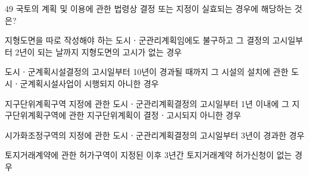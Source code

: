 \begin{question}{49}
국토의 계획 및 이용에 관한 법령상 결정 또는 지정이 실효되는 경우에 해당하는 것은?
\begin{choices}
  \item 지형도면을 따로 작성해야 하는 도시ㆍ군관리계획임에도 불구하고 그 결정의 고시일부터 2년이 되는 날까지 지형도면의 고시가 없는 경우
  \item 도시ㆍ군계획시설결정의 고시일부터 10년이 경과될 때까지 그 시설의 설치에 관한 도시ㆍ군계획시설사업이 시행되지 아니한 경우
  \item 지구단위계획구역 지정에 관한 도시ㆍ군관리계획결정의 고시일부터 1년 이내에 그 지구단위계획구역에 관한 지구단위계획이 결정ㆍ고시되지 아니한 경우
  \item 시가화조정구역의 지정에 관한 도시ㆍ군관리계획결정의 고시일부터 3년이 경과한 경우
  \item 토지거래계약에 관한 허가구역이 지정된 이후 3년간 토지거래계약 허가신청이 없는 경우
\end{choices}
\end{question}
